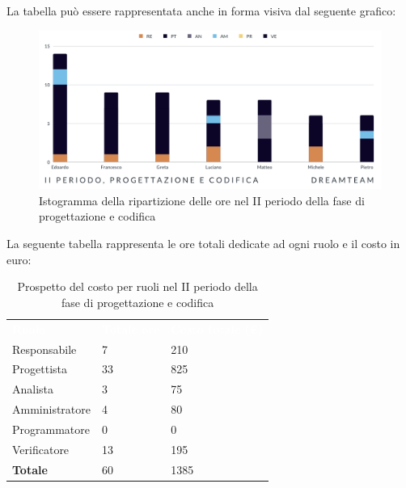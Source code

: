 La tabella può essere rappresentata anche in forma visiva dal seguente grafico:
\begin{figure}[!h]
\centering
\includegraphics[scale=0.65]{Sezioni/SezioniPreventivo/grafici/Progettazione_codifica_II_periodo.png}
\caption{Istogramma della ripartizione delle ore nel II periodo della fase di progettazione e codifica}
\end{figure}

La seguente tabella rappresenta le ore totali dedicate ad ogni ruolo e il costo in euro:

\begin{table}[!htbp]
\begin{center}
\renewcommand{\arraystretch}{1.5}
\begin{tabular}{ m{}<{\centering}  m{}<{\centering} m{}<{\centering}}
	\rowcolor{darkblue}
	\textcolor{white}{\textbf{Ruolo}}&\textcolor{white}{\textbf{Totale ore}}&\textcolor{white}{\textbf{Costo totale (\euro)}}\\ 

	Responsabile  & 7 & 210 \\	
	
	Progettista & 33 & 825 \\
	
	Analista & 3 & 75 \\

	Amministratore & 4 & 80 \\
	
	Programmatore & 0 & 0 \\
	
	Verificatore & 13 & 195 \\
	
	\textbf{Totale} & 60 & 1385 \\
	
\end{tabular}
\caption{Prospetto del costo per ruoli nel II periodo della fase di progettazione e codifica}
\end{center}
\end{table}

